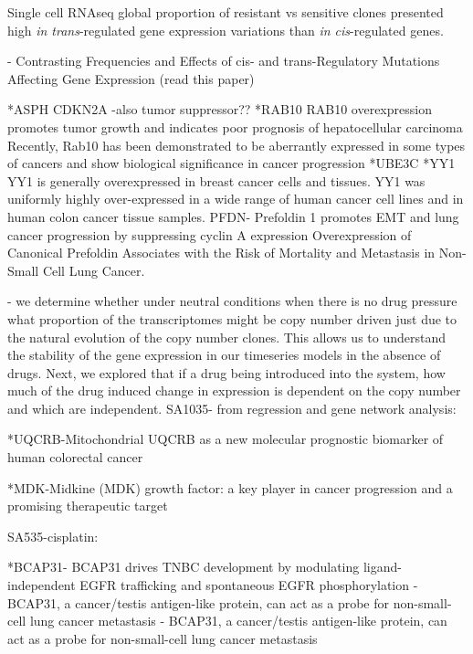 
{Single cell RNAseq global proportion of resistant vs sensitive clones presented high \textit{in trans}-regulated gene expression variations than \textit{in cis}-regulated genes.}

- Contrasting Frequencies and Effects of cis- and trans-Regulatory Mutations Affecting Gene Expression (read this paper)



*ASPH \cite{li2018expression, hou2018recent, kanwal2020aspartate, lin2019asph}
CDKN2A \cite{shahidsales2018genetic}-also tumor suppressor??
*RAB10 \cite{wang2017rab10}RAB10 overexpression promotes tumor growth and indicates poor prognosis of hepatocellular carcinoma
Recently, Rab10 has been demonstrated to be aberrantly expressed in some types of cancers and show biological significance in cancer progression \cite{he2002identification, jiang2016mir}
*UBE3C \cite{xiong2019mir, pan2015ubiquitin, zhang2020ube3c}
*YY1 \cite{wan2012yin, chinnappan2009transcription, meliala2020biological} 
YY1 is generally overexpressed in breast cancer cells and tissues.
YY1 was uniformly highly over-expressed in a wide range of human cancer cell lines and in human colon cancer tissue samples.
PFDN-   Prefoldin 1 promotes EMT and lung cancer progression by suppressing cyclin A expression
Overexpression of Canonical Prefoldin Associates with the Risk of Mortality and Metastasis in Non-Small Cell Lung Cancer. 

- we determine whether under neutral conditions when there is no drug pressure what proportion of the transcriptomes might be copy number driven just due to the natural evolution of the copy number clones. This allows us to understand the stability of the gene expression in our timeseries models in the absence of drugs. 
 Next, we explored that if a drug being introduced into the system, how much of the drug induced change in expression is dependent on the copy number and which are independent.
SA1035- from regression and gene network analysis:

*UQCRB-Mitochondrial UQCRB as a new molecular prognostic biomarker of human colorectal cancer

*MDK-Midkine (MDK) growth factor: a key player in cancer progression and a promising therapeutic target

SA535-cisplatin:

*BCAP31- BCAP31 drives TNBC development by modulating ligand-independent EGFR trafficking and spontaneous EGFR phosphorylation
-BCAP31, a cancer/testis antigen-like protein, can act as a probe for non-small-cell lung cancer metastasis
- BCAP31, a cancer/testis antigen-like protein, can act as a probe for non-small-cell lung cancer metastasis

